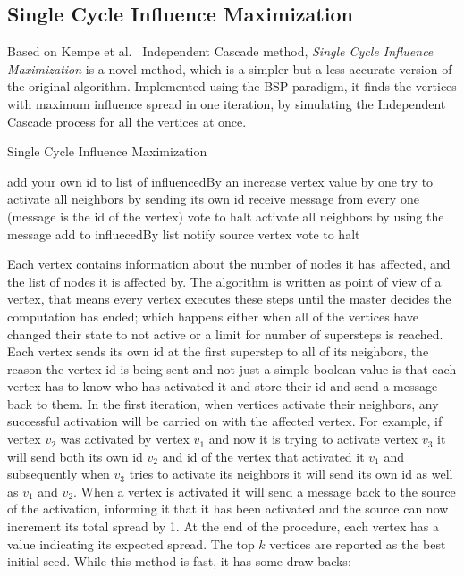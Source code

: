 \documentclass[english]{tktltiki}
\begin{document}
\subsection{Single Cycle Influence Maximization}
Based on Kempe et al.\ \cite{kempe03} Independent Cascade method, \textit{Single Cycle Influence Maximization} is a novel method, which is a simpler but a less accurate version of the original algorithm. 
Implemented using the BSP paradigm, it finds the vertices with maximum influence spread in one iteration, by simulating the Independent Cascade process for all the vertices at once.
\begin{algorithm}[ht!]
\caption{Single Cycle Influence Maximization}
\label{alg:singleccycleIM}
\begin{algorithmic}
	\State add your own id to list of influencedBy an increase vertex value by one
	\State try to activate all neighbors by sending its own id
\Else
	\State receive message from every one (message is the id of the vertex)
			\State vote to halt
		\Else
			\State activate all neighbors by using the message
			\State add to influecedBy list
			\State notify source vertex
			\State vote to halt
		\EndIf	
	\EndFor
\EndIf
\end{algorithmic}
\end{algorithm}
Each vertex contains information about the number of nodes it has affected, and the list of nodes it is affected by. The algorithm is written as point of view of a vertex, that means every vertex executes these steps until the master decides the computation has ended; which happens either when all of the vertices have changed their state to not active or a limit for number of supersteps is reached. Each vertex sends its own id at the first superstep to all of its neighbors, the reason the vertex id is being sent and not just a simple boolean value is that each vertex has to know who has activated it and store their id and send a message back to them. In the first iteration, when vertices activate their neighbors, any successful activation will be carried on with the affected vertex. For example, if vertex $v_2$ was activated by vertex $v_1$ and now it is trying to activate vertex $v_3$ it will send both its own id $v_2$ and id of the vertex that activated it $v_1$ and subsequently when $v_3$ tries to activate its neighbors it will send its own id as well as $v_1$ and $v_2$. When a vertex is activated it will send a message back to the source of the activation, informing it that it has been activated and the source can now increment its total spread by 1. At the end of the procedure, each vertex has a value indicating its expected spread. The top $k$ vertices are reported as the best initial seed. While this method is fast, it has some draw backs:
\end{document}
